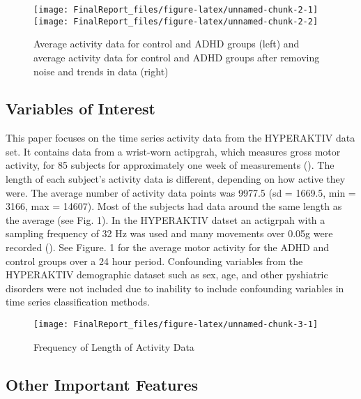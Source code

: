 \documentclass[,article,,moreauthors,pdftex]{mdpi}
\begin{document}
\begin{figure}
\texttt{[image: FinalReport\_files/figure-latex/unnamed-chunk-2-1]} \texttt{[image: FinalReport\_files/figure-latex/unnamed-chunk-2-2]} \caption{Average activity data for control and ADHD groups (left) and average activity data for control and ADHD groups after removing noise and trends in data (right)}\label{fig:unnamed-chunk-2}
\end{figure}

\hypertarget{variables-of-interest}{%
\subsection{Variables of Interest}\label{variables-of-interest}}

This paper focuses on the time series activity data from the HYPERAKTIV
data set. It contains data from a wrist-worn actipgrah, which measures
gross motor activity, for 85 subjects for approximately one week of
measurements (\citet{10.1145/3458305.3478454}). The length of each
subject's activity data is different, depending on how active they were.
The average number of activity data points was 9977.5 (sd = 1669.5, min
= 3166, max = 14607). Most of the subjects had data around the same
length as the average (see Fig. 1). In the HYPERAKTIV datset an
actigrpah with a sampling frequency of 32 Hz was used and many movements
over 0.05g were recorded (\citet{10.1145/3458305.3478454}). See Figure.
1 for the average motor activity for the ADHD and control groups over a
24 hour period. Confounding variables from the HYPERAKTIV demographic
dataset such as sex, age, and other pyshiatric disorders were not
included due to inability to include confounding variables in time
series classification methods.

\begin{figure}

{\centering \texttt{[image: FinalReport\_files/figure-latex/unnamed-chunk-3-1]} 

}

\caption{Frequency of Length of Activity Data}\label{fig:unnamed-chunk-3}
\end{figure}

\hypertarget{other-important-features}{%
\subsection{Other Important Features}\label{other-important-features}}
\end{document}
